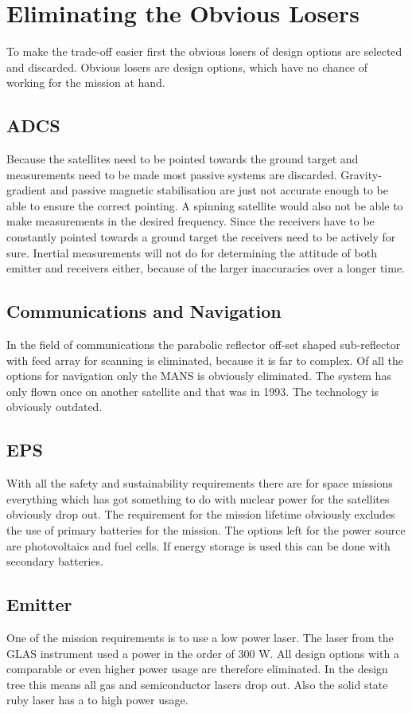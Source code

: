 \section{Eliminating the Obvious Losers}
To make the trade-off easier first the obvious losers of design options are selected and discarded. Obvious losers are design options, which have no chance of working for the mission at hand.

\subsection{\ac{ADCS}}
Because the satellites need to be pointed towards the ground target and measurements need to be made most passive systems are discarded. Gravity-gradient and passive magnetic stabilisation are just not accurate enough to be able to ensure the correct pointing. A spinning satellite would also not be able to make measurements in the desired frequency. Since the receivers have to be constantly pointed towards a ground target the receivers need to be actively for sure. Inertial measurements will not do for determining the attitude of both emitter and receivers either, because of the larger inaccuracies over a longer time.

\subsection{Communications and Navigation}
In the field of communications the parabolic reflector off-set shaped sub-reflector with feed array for scanning is eliminated, because it is far to complex.
Of all the options for navigation only the \ac{MANS} is obviously eliminated. The system has only flown once on another satellite and that was in 1993. The technology is obviously outdated.

\subsection{\ac{EPS}}
With all the safety and sustainability requirements there are for space missions everything which has got something to do with nuclear power for the satellites obviously drop out. The requirement for the mission lifetime obviously excludes the use of primary batteries for the mission. The options left for the power source are photovoltaics and fuel cells. If energy storage is used this can be done with secondary batteries.

\subsection{Emitter}
One of the mission requirements is to use a low power laser. The laser from the \ac{GLAS} instrument used a power in the order of 300 W. All design options with a comparable or even higher power usage are therefore eliminated. In the design tree this means all gas and semiconductor lasers drop out. Also the solid state ruby laser has a to high power usage.

